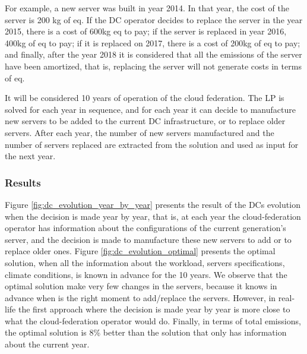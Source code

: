 For example, a new server was built in year 2014. In that year, the cost of the server is 200 kg of  eq. If the DC operator decides to replace the server in the year 2015, there is a cost of 600kg  eq to pay; if the server is replaced in year 2016, 400kg of  eq to pay; if it is replaced on 2017, there is a cost of 200kg of  eq to pay; and finally, after the year 2018 it is considered that all the emissions of the server have been amortized, that is, replacing the server will not generate costs in terms of  eq.

It will be considered 10 years of operation of the cloud federation. The LP is solved for each year in sequence, and for each year it can decide to manufacture new servers to be added to the current DC infrastructure, or to replace older servers. After each year, the number of new servers manufactured and the number of servers replaced are extracted from the solution and used as input for the next year. 

\subsubsection{Results}

Figure \ref{fig:dc_evolution_year_by_year} presents the result of the DCs evolution when the decision is made year by year, that is, at each year the cloud-federation operator has information about the configurations of the current generation's server, and the decision is made to manufacture these new servers to add or to replace older ones. Figure \ref{fig:dc_evolution_optimal} presents the optimal solution, when all the information about the workload, servers specifications, climate conditions, is known in advance for the 10 years. We observe that the optimal solution make very few changes in the servers, because it knows in advance when is the right moment to add/replace the servers. However, in real-life the first approach where the decision is made year by year is more close to what the cloud-federation operator would do. Finally, in terms of total  emissions, the optimal solution is 8\% better than the solution that only has information about the current year.

